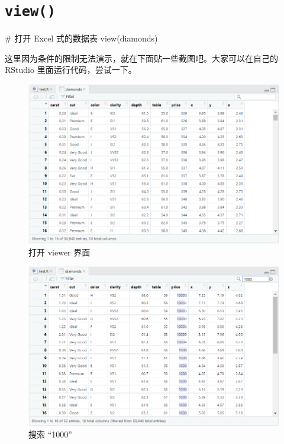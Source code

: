 \documentclass[
  letterpaper,
]{ctexbook}
\newenvironment{Shaded}{\begin{snugshade}}{\end{snugshade}}
\newcommand{\CommentTok}[1]{\textcolor[rgb]{0.37,0.37,0.37}{#1}}
\newcommand{\FunctionTok}[1]{\textcolor[rgb]{0.28,0.35,0.67}{#1}}
\newcommand{\NormalTok}[1]{\textcolor[rgb]{0.00,0.23,0.31}{#1}}
\begin{document}
\hypertarget{view}{%
\section{\texorpdfstring{\texttt{view()}}{view()}}\label{view}}

\begin{Shaded}
\begin{Highlighting}[]
\CommentTok{\# 打开 Excel 式的数据表}
\FunctionTok{view}\NormalTok{(diamonds)}
\end{Highlighting}
\end{Shaded}

这里因为条件的限制无法演示，就在下面贴一些截图吧。大家可以在自己的
RStudio 里面运行代码，尝试一下。

\begin{figure}

{\centering \includegraphics{fig/view1.png}

}

\caption{\label{fig-view1}打开 viewer 界面}

\end{figure}

\begin{figure}

{\centering \includegraphics{fig/view2.png}

}

\caption{\label{fig-view2}搜索 ``1000''}

\end{figure}
\end{document}
